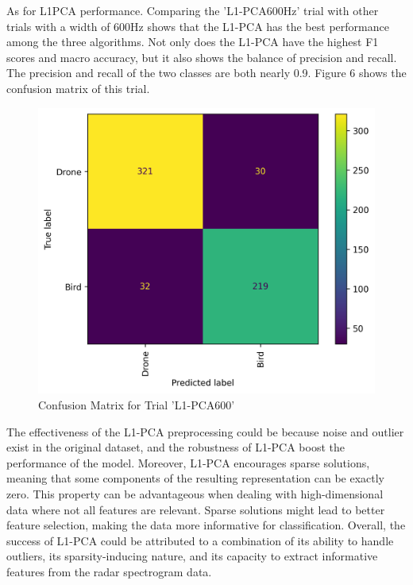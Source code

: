 \documentclass{cta-author}
\begin{document}
As for L1PCA performance. Comparing the 'L1-PCA600Hz' trial with other trials with a width of 600Hz shows that the L1-PCA has the best performance among the three algorithms. 
Not only does the L1-PCA have the highest F1 scores and macro accuracy, but it also shows the balance of precision and recall. The precision and recall of the two classes are both nearly 0.9. Figure 6 shows the confusion matrix of this trial.
\begin{figure}[h]
\centering\includegraphics[scale = 0.5]{Image/L1PCA_with601binCFM60.png}
\caption{Confusion Matrix for Trial 'L1-PCA600'}
\end{figure}
The effectiveness of the L1-PCA preprocessing could be because noise and outlier exist in the original dataset, and the robustness of L1-PCA boost the performance of the model.
Moreover, L1-PCA encourages sparse solutions, meaning that some components of the resulting representation can be exactly zero. This property can be advantageous when dealing with high-dimensional data where not all features are relevant. Sparse solutions might lead to better feature selection, making the data more informative for classification.
Overall, the success of L1-PCA could be attributed to a combination of its ability to handle outliers, its sparsity-inducing nature, and its capacity to extract informative features from the radar spectrogram data.
\end{document}
